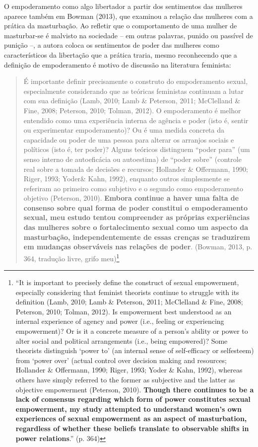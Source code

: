 O empoderamento como algo libertador a partir dos sentimentos das mulheres aparece também em Bowman (2013), que examinou a relação das mulheres com a prática da masturbação. Ao refletir que o comportamento de uma mulher de masturbar-se é malvisto na sociedade – em outras palavras, punido ou passível de punição –, a autora coloca os sentimentos de poder das mulheres como característicos da libertação que a prática traria, mesmo reconhecendo que a definição de empoderamento é motivo de discussão na literatura feminista:
\newline
\begin{quote}
    É importante definir precisamente o construto do empoderamento sexual, especialmente considerando que as teóricas feministas continuam a lutar com sua definição (Lamb, 2010; Lamb \& Peterson, 2011; McClelland \& Fine, 2008; Peterson, 2010; Tolman, 2012). O empoderamento é melhor entendido como uma experiência interna de agência e poder (isto é, sentir ou experimentar empoderamento)? Ou é uma medida concreta da capacidade ou poder de uma pessoa para alterar os arranjos sociais e políticos (isto é, ter poder)? Alguns teóricos distinguem ``poder para'' (um senso interno de autoeficácia ou autoestima) de ``poder sobre'' (controle real sobre a tomada de decisões e recursos; Hollander \& Offermann, 1990; Riger, 1993; Yoder\& Kahn, 1992), enquanto outros simplesmente se referiram ao primeiro como subjetivo e o segundo como empoderamento objetivo (Peterson, 2010). \textbf{Embora continue a haver uma falta de consenso sobre qual forma de poder constitui o empoderamento sexual, meu estudo tentou compreender as próprias experiências das mulheres sobre o fortalecimento sexual como um aspecto da masturbação, independentemente de essas crenças se traduzirem em mudanças observáveis nas relações de poder}. (Bowman, 2013, p. 364, tradução livre, grifo meu)\footnote{``It is important to precisely define the construct of sexual empowerment, especially considering that feminist theorists continue to struggle with its definition (Lamb, 2010; Lamb \& Peterson, 2011; McClelland \& Fine, 2008; Peterson, 2010; Tolman, 2012). Is empowerment best understood as an internal experience of agency and power (i.e., feeling or experiencing empowerment)? Or is it a concrete measure of a person’s ability or power to alter social and political arrangements (i.e., being empowered)? Some theorists distinguish ‘power to’ (an internal sense of self-efficacy or selfesteem) from ‘power over’ (actual control over decision making and resources; Hollander \& Offermann, 1990; Riger, 1993; Yoder \& Kahn, 1992), whereas others have simply referred to the former as subjective and the latter as objective empowerment (Peterson, 2010). \textbf{Though there continues to be a lack of consensus regarding which form of power constitutes sexual empowerment, my study attempted to understand women’s own experiences of sexual empowerment as an aspect of masturbation, regardless of whether these beliefs translate to observable shifts in power relations}.'' (p. 364)}
\end{quote}

